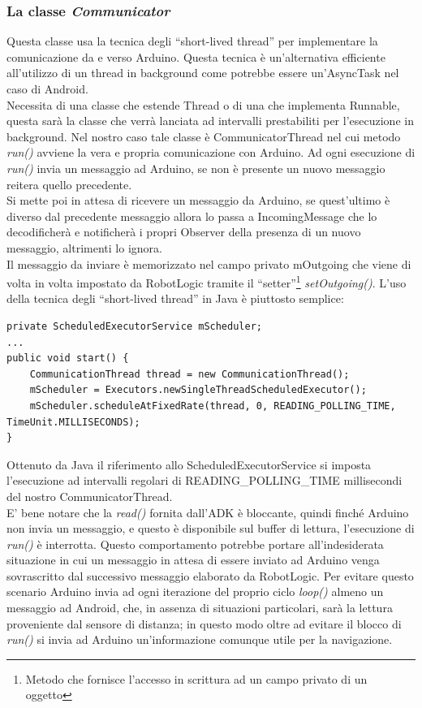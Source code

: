 \subsubsection{La classe \emph{Communicator}}
Questa classe usa la tecnica degli ``short-lived thread'' per implementare la comunicazione da e verso
Arduino. Questa tecnica è un'alternativa efficiente all'utilizzo di un thread in background come 
potrebbe essere un'AsyncTask nel caso di Android.\\
Necessita di una classe che estende Thread o di una che implementa Runnable, questa 
sarà la classe che verrà lanciata ad intervalli prestabiliti per l'esecuzione in background.
Nel nostro caso tale classe è CommunicatorThread nel cui metodo \emph{run()} avviene
la vera e propria comunicazione con Arduino. Ad ogni esecuzione di \emph{run()} 
invia un messaggio ad Arduino, se non è presente un nuovo messaggio reitera quello precedente.\\
Si mette poi in attesa di ricevere un messaggio da Arduino, se quest'ultimo è 
diverso dal precedente messaggio allora lo passa a IncomingMessage che lo decodificherà
e notificherà i propri Observer della presenza di un nuovo messaggio, altrimenti lo ignora.\\
Il messaggio da inviare è memorizzato nel campo privato mOutgoing che viene di volta 
in volta impostato da RobotLogic tramite il ``setter''\footnote{Metodo che fornisce 
l'accesso in scrittura ad un campo privato di un oggetto} \emph{setOutgoing()}.
L'uso della tecnica degli ``short-lived thread'' in Java è piuttosto semplice:
\begin{lstlisting}[caption=Metodo di inizializzazzione degli short-lived thread in Communicator] 
private ScheduledExecutorService mScheduler;
...
public void start() {
    CommunicationThread thread = new CommunicationThread();
    mScheduler = Executors.newSingleThreadScheduledExecutor();
    mScheduler.scheduleAtFixedRate(thread, 0, READING_POLLING_TIME, TimeUnit.MILLISECONDS);
}
\end{lstlisting}
Ottenuto da Java il riferimento allo ScheduledExecutorService si imposta l'esecuzione ad 
intervalli regolari di READING\_POLLING\_TIME millisecondi del nostro CommunicatorThread.\\ 
E' bene notare che la \emph{read()} fornita dall'ADK è bloccante, quindi finché Arduino
non invia un messaggio, e questo è disponibile sul buffer di lettura, l'esecuzione di 
\emph{run()} è interrotta. Questo comportamento potrebbe portare 
all'indesiderata situazione in cui un messaggio in attesa di essere inviato ad Arduino
venga sovrascritto dal successivo messaggio elaborato da RobotLogic. Per evitare questo scenario
Arduino invia ad ogni iterazione del proprio ciclo \emph{loop()} almeno un messaggio ad
Android, che, in assenza di situazioni particolari, sarà la lettura proveniente dal 
sensore di distanza; in questo modo oltre ad evitare il blocco di \emph{run()} 
si invia ad Arduino un'informazione comunque utile per la navigazione.
